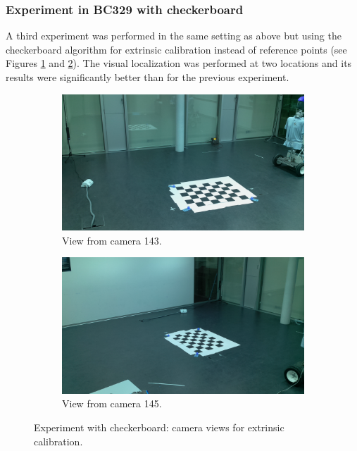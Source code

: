 \subsubsection{Experiment in BC329 with checkerboard}

A third experiment was performed in the same setting as above but using the checkerboard algorithm for extrinsic calibration instead of reference points (see Figures \ref{fig:res2_image_143} and  \ref{fig:res2_image_145}). 
The visual localization was performed at two locations and its results were significantly better than for the previous experiment. 

\begin{figure}
    \centering
    \begin{subfigure}{0.49\linewidth}
        \centering
        \includegraphics[width=\linewidth]{files/res2_image_143.png}
        \caption{View from camera 143.}
        \label{fig:res2_image_143}
    \end{subfigure}
    \begin{subfigure}{0.49\linewidth}
        \centering
        \includegraphics[width=\linewidth]{files/res2_image_145.png}
        \caption{View from camera 145.}
        \label{fig:res2_image_145}
    \end{subfigure}
    \caption{Experiment with checkerboard: camera views for extrinsic calibration.}
    \label{fig:experiment2}
\end{figure}

